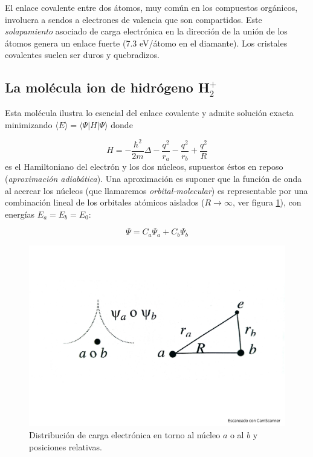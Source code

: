 El enlace covalente entre dos átomos, muy común en los compuestos orgánicos, involucra a sendos a electrones de valencia  que son compartidos. Este \textit{solapamiento} asociado de carga electrónica en la dirección de la unión de los átomos genera un enlace fuerte (7.3 eV/átomo en el diamante). Los cristales covalentes suelen ser duros y quebradizos.

\subsection{La molécula ion de hidrógeno H$_2^+$}

Esta molécula ilustra lo esencial del enlace covalente y admite solución exacta minimizando $\langle E \rangle = \langle \Psi | H | \Psi \rangle$ donde 

\begin{equation*}
    H = - \frac{\hbar^2}{2m} \Delta - \frac{q^2}{r_a} - \frac{q^2}{r_b} + \frac{q^2}{R}
\end{equation*}
es el Hamiltoniano del electrón y los dos núcleos, supuestos éstos en reposo (\textit{aproximación adiabática}). Una aproximación es suponer que la función de onda al acercar los núcleos (que llamaremos \textit{orbital-molecular}) es representable por una combinación lineal de los orbitales atómicos aislados ($R \rightarrow \infty$, ver figura \ref{Fig:03-04}), con energías $E_a = E_b = E_0$:

\begin{equation}
    \Psi = C_a \Psi_a + C_b \Psi_b \label{Ec:03-04-01}
\end{equation}

\begin{figure}[h!] \centering
    \includegraphics[scale=0.5]{Cuerpo/Ch_03/Fotos libro 3.pdf}
    \caption{Distribución de carga electrónica en torno al núcleo $a$ o al $b$ y posiciones relativas.}
    \label{Fig:03-04}
\end{figure}    


